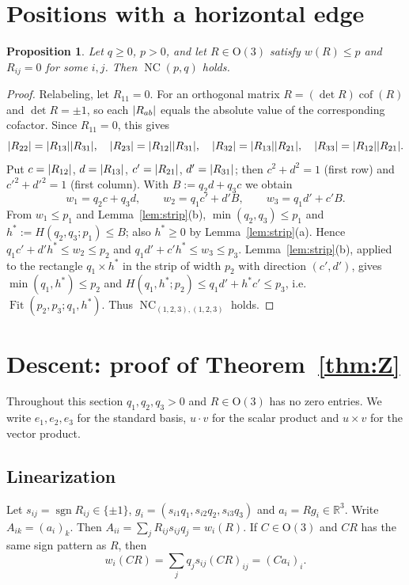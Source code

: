 \documentclass[11pt]{article}
\newtheorem{proposition}[theorem]{Proposition}
\theoremstyle{definition}
\theoremstyle{remark}
\newcommand{\R}{\mathbb{R}}
\newcommand{\Ort}{\mathrm{O}(3)}
\newcommand{\Fit}{\operatorname{Fit}}
\newcommand{\NC}{\operatorname{NC}}
\newcommand{\sgn}{\operatorname{sgn}}
\DeclarePairedDelimiter{\abs}{\lvert}{\rvert}
\begin{document}
\section{Positions with a horizontal edge}\label{sec:zero}

\begin{proposition}\label{prop:zero}
Let $q\ge0$, $p>0$, and let $R\in\Ort$ satisfy $w(R)\le p$ and $R_{ij}=0$ for some $i,j$. Then
$\NC(p,q)$ holds.
\end{proposition}

\begin{proof}
Relabeling, let $R_{11}=0$. For an orthogonal matrix $R=(\det R)\operatorname{cof}(R)$ and
$\det R=\pm1$, so each $\abs{R_{ab}}$ equals the absolute value of the corresponding cofactor. Since
$R_{11}=0$, this gives
\[
\abs{R_{22}}=\abs{R_{13}}\abs{R_{31}},\quad \abs{R_{23}}=\abs{R_{12}}\abs{R_{31}},\quad
\abs{R_{32}}=\abs{R_{13}}\abs{R_{21}},\quad \abs{R_{33}}=\abs{R_{12}}\abs{R_{21}}.
\]
Put $c=\abs{R_{12}}$, $d=\abs{R_{13}}$, $c'=\abs{R_{21}}$, $d'=\abs{R_{31}}$; then
$c^2+d^2=1$ (first row) and $c'^2+d'^2=1$ (first column). With $B:=q_2d+q_3c$ we obtain
\[
w_1=q_2c+q_3d,\qquad w_2=q_1c'+d'B,\qquad w_3=q_1d'+c'B .
\]
From $w_1\le p_1$ and Lemma~\ref{lem:strip}(b), $\min(q_2,q_3)\le p_1$ and $h^*:=H(q_2,q_3;p_1)\le B$;
also $h^*\ge0$ by Lemma~\ref{lem:strip}(a). Hence $q_1c'+d'h^*\le w_2\le p_2$ and
$q_1d'+c'h^*\le w_3\le p_3$. Lemma~\ref{lem:strip}(b), applied to the rectangle $q_1\times h^*$ in
the strip of width $p_2$ with direction $(c',d')$, gives $\min(q_1,h^*)\le p_2$ and
$H(q_1,h^*;p_2)\le q_1d'+h^*c'\le p_3$, i.e.\ $\Fit(p_2,p_3;q_1,h^*)$. Thus
$\NC_{(1,2,3),(1,2,3)}$ holds.
\end{proof}

\section{Descent: proof of Theorem~\ref{thm:Z}}\label{sec:descent}

Throughout this section $q_1,q_2,q_3>0$ and $R\in\Ort$ has no zero entries. We write $e_1,e_2,e_3$
for the standard basis, $u\cdot v$ for the scalar product and $u\times v$ for the vector product.

\subsection{Linearization}
Let $s_{ij}=\sgn R_{ij}\in\{\pm1\}$, $g_i=(s_{i1}q_1,s_{i2}q_2,s_{i3}q_3)$ and $a_i=Rg_i\in\R^3$.
Write $A_{ik}=(a_i)_k$. Then $A_{ii}=\sum_j R_{ij}s_{ij}q_j=w_i(R)$. If $C\in\Ort$ and $CR$ has the
same sign pattern as $R$, then
\begin{equation}\label{eq:lin}
w_i(CR)=\sum_j q_j s_{ij}(CR)_{ij}=(Ca_i)_i .
\end{equation}
\end{document}

